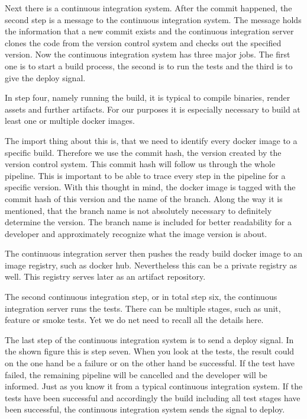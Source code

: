 Next there is a continuous integration system. After the commit happened, the second step
is a message to the continuous integration system. The message holds the information that
a new commit exists and the continuous integration server clones the code from the version
control system and checks out the specified version. Now the continuous integration system
has three major jobs. The first one is to start a build process, the second is to run the
tests and the third is to give the deploy signal.

In step four, namely running the build, it is typical to compile binaries, render assets
and further artifacts. For our purposes it is especially necessary to build at least one
or multiple docker images.

The import thing about this is, that we need to identify every docker image to a specific
build. Therefore we use the commit hash, the version created by the version control
system. This commit hash will follow us through the whole pipeline. This is important to
be able to trace every step in the pipeline for a specific version. With this thought in
mind, the docker image is tagged with the commit hash of this version and the name of the
branch. Along the way it is mentioned, that the branch name is not absolutely necessary to
definitely determine the version. The branch name is included for better readability for a
developer and approximately recognize what the image version is about.

The continuous integration server then pushes the ready build docker image to an image
registry, such as docker hub. Nevertheless this can be a private registry as well. This
registry serves later as an artifact repository.

The second continuous integration step, or in total step six, the continuous integration
server runs the tests. There can be multiple stages, such as unit, feature or smoke
tests. Yet we do net need to recall all the details here.

The last step of the continuous integration system is to send a deploy signal. In the
shown figure this is step seven. When you look at the tests, the result could on the one
hand be a failure or on the other hand be successful. If the test have failed, the
remaining pipeline will be cancelled and the developer will be informed. Just as you know
it from a typical continuous integration system. If the tests have been successful and
accordingly the build including all test stages have been successful, the continuous
integration system sends the signal to deploy.


